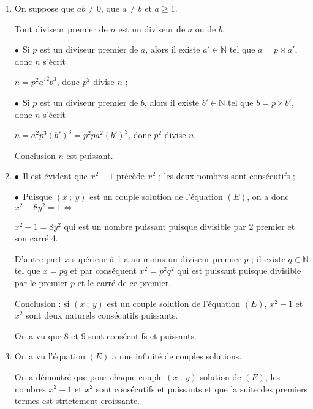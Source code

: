 \documentclass[10pt]{article}
\newcommand{\N}{\mathbb{N}}
\begin{document}
\begin{enumerate}[resume]
\item  %

On suppose que $ab\neq 0$, que $a \neq b$ et $a \geqslant 1$.

Tout diviseur premier de $n$ est un diviseur de $a$ ou de $b$.

$\bullet~~$Si $p$ est un diviseur premier de $a$, alors il existe $a' \in \N$ tel que $a = p \times a'$, donc $n$ s'écrit 

$n = p^2a'^2b^3$, donc $p^2$ divise $n$ ;

$\bullet~~$Si $p$ est un diviseur premier de $b$, alors il existe $b' \in \N$ tel que $b = p \times b'$, donc $n$ s'écrit 

$n = a^2p^3\left(b'\right)^3 = p^2pa^2\left(b'\right)^3$, donc $p^2$ divise $n$.

Conclusion $n$ est puissant.
\item  %
$\bullet~~$Il est évident que $x^2 - 1$ précède $x^2$ ; les deux nombres sont consécutifs ;

$\bullet~~$Puisque $(x~;~y)$ est un couple solution de l'équation $(E)$, on a donc $x^2 - 8y^2 = 1 \iff$

$ x^2 - 1 = 8y^2$ qui est un nombre puissant puisque divisible par 2  premier et son carré 4.

D'autre part $x$ supérieur à 1 a au moins un diviseur premier $p$ ; il existe $q \in \N$ tel que $x = pq$ et par conséquent $x^2 = p^2q^2$ qui est puissant puisque divisible par le premier $p$ et le carré de ce premier.

Conclusion : si $(x~;~y)$ est un couple solution de l'équation $(E)$, $x^2 - 1$ et $x^2$ sont deux naturels consécutifs puissants.

On a vu que 8 et 9 sont consécutifs et puissants.
\item  %


On a vu l'équation $(E)$ a une infinité de couples solutions.

On a démontré que pour chaque couple $(x~;~y)$ solution de $(E)$, les nombres $x^2 - 1$ et $x^2$ sont consécutifs et puissants et que la suite des premiers termes est strictement croissante.


\end{enumerate}
\end{document}
